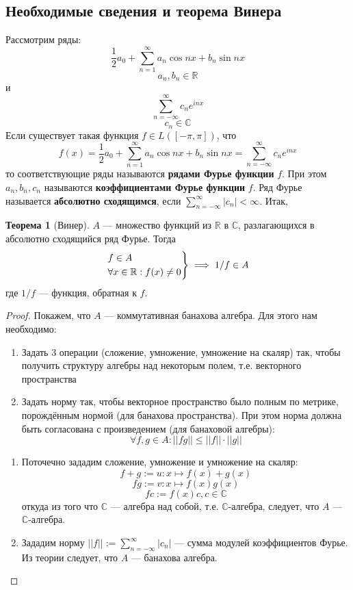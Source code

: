 \documentclass[12pt]{extarticle}
\theoremstyle{definition}
\newtheorem{theorem}{\indent Теорема}[section]
\begin{document}
  	\subsection{Необходимые сведения и теорема Винера}
  	\noindent
  		Рассмотрим ряды:
  		$$\frac{1}{2}a_0+\sum_{n=1}^{\infty} a_n \cos nx+b_n \sin nx$$ $$a_n,b_n\in\mathbb{R}$$
  		и
  		$$\sum_{n=-\infty}^\infty c_n e^{inx}$$
  		$$c_n\in\mathbb{C}$$
  		Если существует такая функция $f\in L([-\pi,\pi])$, что $$f(x)=\frac{1}{2}a_0+\sum_{n=1}^{\infty} a_n \cos nx+b_n \sin nx=\sum_{n=-\infty}^\infty c_n e^{inx}$$
  		то соответствующие ряды называются \textbf{рядами Фурье функции} $f$. При этом $a_n,b_n, c_n$ называются \textbf{коэффициентами Фурье функции} $f$. Ряд Фурье называется \textbf{абсолютно сходящимся}, если $\sum_{n=-\infty}^\infty |c_n|<\infty$. Итак,
        \begin{theorem}[Винер]\label{th:Wiener}
        $A$ — множество функций из $\mathbb{R}$ в $\mathbb{C}$, разлагающихся в абсолютно сходящийся ряд Фурье. Тогда
      $$
    \begin{drcases}
		f\in A\\
		 \forall x\in\mathbb{R}: f(x)\neq 0
    \end{drcases}\implies 1/f\in A
    $$
    где $1/f$ — функция, обратная к $f$.
    \begin{proof}
		Покажем, что $A$ — коммутативная банахова алгебра. Для этого нам необходимо:
		\begin{enumerate}
			\item Задать 3 операции (сложение, умножение, умножение на скаляр) так, чтобы получить структуру алгебры над некоторым полем, т.е. векторного пространства
			\item Задать норму так, чтобы векторное пространство было полным по метрике, порождённым нормой (для банахова пространства). При этом норма должна быть согласована с произведением (для банаховой алгебры):
			$$\forall f,g\in A: ||fg||\leq ||f||\cdot||g||$$
		\end{enumerate}
		\begin{enumerate}
			\item Поточечно зададим сложение, умножение и умножение на скаляр:
				$$
			f+g:=u: x\mapsto f(x)+g(x)
			$$
			$$fg:=v:x\mapsto f(x)g(x)$$
			$$fc:=f(x)c,c\in\mathbb{C}$$
			откуда из того что $\mathbb{C}$ — алгебра над собой, т.е. $\mathbb{C}$-алгебра, следует, что $A$ — $\mathbb{C}$-алгебра.
			\item Зададим норму $||f||:=\sum_{n=-\infty}^\infty |c_n|$ — сумма модулей коэффициентов Фурье. Из теории следует, что $A$ — банахова алгебра.

\end{enumerate}
\end{proof}
\end{theorem}
\end{document}
